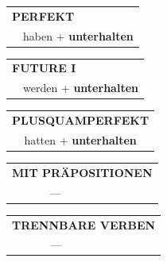 \documentclass[10pt,a4paper]{revtex4-2}
\begin{document}
\begin{verbbox-acc}
\vspace{10pt}

\begin{tabular}{rl}
\multicolumn{2}{l}{\textbf{PERFEKT}}\\
& haben + \textbf{unterhalten}\\
\end{tabular}
\hfill
\begin{tabular}{rl}
\multicolumn{2}{l}{\textbf{FUTURE I}}\\
& werden + \textbf{unterhalten}\\
\end{tabular}
\hfill
\begin{tabular}{rl}
\multicolumn{2}{l}{\textbf{PLUSQUAMPERFEKT}}\\
& hatten + \textbf{unterhalten}\\
\end{tabular}

\vspace{10pt}

\begin{tabular}{lll}
\multicolumn{3}{l}{\textbf{MIT PRÄPOSITIONEN}}\\
& ---\\
\end{tabular}
\hfill
\begin{tabular}{lll}
\multicolumn{3}{l}{\textbf{TRENNBARE VERBEN}}\\
& ---\\
\end{tabular}

\vspace{-5pt}
\end{verbbox-acc}
\end{document}
